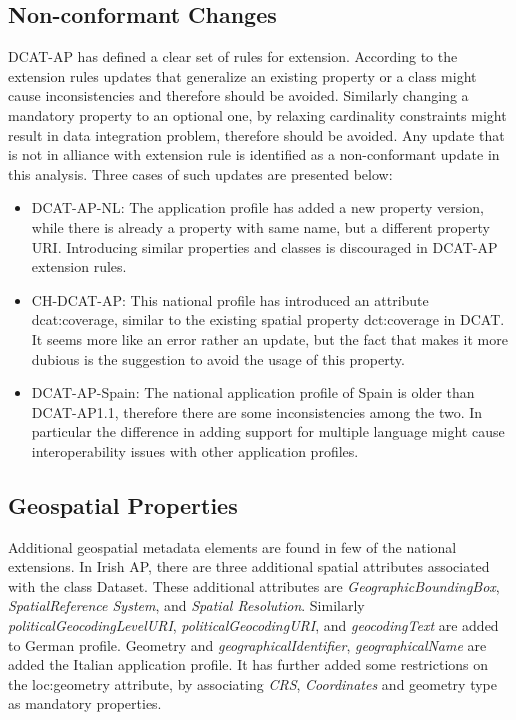 \documentclass[<options>]{elsarticle}
\begin{document}
\subsection{Non-conformant Changes}
DCAT-AP has defined a clear set of rules for extension. According to the extension rules updates that generalize an existing property or a class might cause inconsistencies and therefore should be avoided. Similarly changing a mandatory property to an optional one, by relaxing cardinality constraints might result in data integration problem, therefore should be avoided. Any update that is not in alliance with extension rule is identified as a non-conformant update in this analysis. Three cases of such updates are presented below:

\begin{itemize}
\item DCAT-AP-NL: The application profile has added a new property version, while there is already a property with same name, but a different property URI. Introducing similar properties and classes is discouraged in DCAT-AP extension rules.
\item CH-DCAT-AP: This national profile has introduced an attribute dcat:coverage, similar to the existing spatial property dct:coverage in DCAT. It seems more like an error rather an update, but the fact that makes it more dubious is the suggestion to avoid the usage of this property.   
\item DCAT-AP-Spain: The national application profile of Spain is older than DCAT-AP1.1, therefore there are some inconsistencies among the two. In particular the difference in adding support for multiple language might cause interoperability issues with other application profiles. 
\end{itemize}

\subsection{Geospatial Properties}
Additional geospatial metadata elements are found in few of the national extensions. In Irish AP, there are three additional spatial attributes associated with the class Dataset. These additional attributes are \textit{GeographicBoundingBox}, \textit{SpatialReference System}, and \textit{Spatial Resolution}. Similarly \textit{politicalGeocodingLevelURI}, \textit{politicalGeocodingURI}, and \textit{geocodingText }are added to German profile. Geometry and \textit{geographicalIdentifier}, \textit{geographicalName }are added the Italian application profile. It has further added some restrictions on the loc:geometry attribute, by associating \textit{CRS}, \textit{Coordinates} and geometry type  as mandatory properties.
\end{document}
